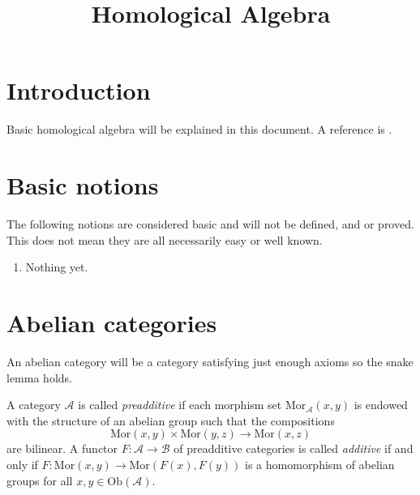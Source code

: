 

%


\title{Homological Algebra}


\maketitle

\tableofcontents

\section{Introduction}
\label{section-introduction}

\noindent
Basic homological algebra will be explained in this document.
A reference is \cite{Maclane}.

\section{Basic notions}
\label{section-topology-basic}

\noindent
The following notions are considered basic and will not be defined,
and or proved. This does not mean they are all necessarily easy or 
well known.

\begin{enumerate}
\item Nothing yet.
\end{enumerate}


\section{Abelian categories}
\label{section-abelian-categories}

\noindent
An abelian category will be a category satisfying
just enough axioms so the snake lemma holds.

\begin{definition}
\label{definition-preadditive}
A category $\mathcal{A}$ is called {\it preadditive} if each
morphism set $\text{Mor}_{\mathcal{A}}(x, y)$ is endowed
with the structure of an abelian group such that the
compositions
$$
\text{Mor}(x, y) \times \text{Mor}(y, z)
\longrightarrow
\text{Mor}(x, z)
$$
are bilinear. A functor $F : \mathcal{A} \to \mathcal{B}$ of
preadditive categories is called {\it additive} if and only
if $F : \text{Mor}(x, y) \to \text{Mor}(F(x), F(y))$
is a homomorphism of abelian groups for all
$x, y \in \text{Ob}(\mathcal{A})$.
\end{definition}

